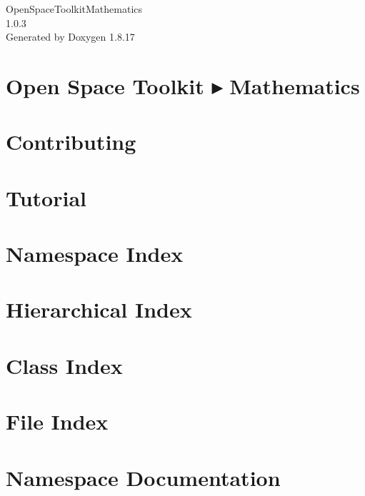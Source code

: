 \let\mypdfximage\pdfximage\def\pdfximage{\immediate\mypdfximage}\documentclass[twoside]{book}
\newcommand{\+}{\discretionary{\mbox{\scriptsize$\hookleftarrow$}}{}{}}
\newcommand{\clearemptydoublepage}{%
  \newpage{\pagestyle{empty}\cleardoublepage}%
}
\begin{document}
\hypersetup{pageanchor=false,
             bookmarksnumbered=true,
             pdfencoding=unicode
            }
\begin{titlepage}
\vspace*{7cm}
\begin{center}%
{\Large Open\+Space\+Toolkit\+Mathematics \\[1ex]\large 1.\+0.\+3 }\\
\vspace*{1cm}
{\large Generated by Doxygen 1.8.17}\\
\end{center}
\end{titlepage}
\clearemptydoublepage
{}
\tableofcontents
\clearemptydoublepage
{}
\hypersetup{pageanchor=true}

\chapter{Open Space Toolkit ▸ Mathematics}
\label{index}\hypertarget{index}{}
\chapter{Contributing}
\label{md__c_o_n_t_r_i_b_u_t_i_n_g}

\chapter{Tutorial}
\label{md_docs__tutorial}

\chapter{Namespace Index}

\chapter{Hierarchical Index}

\chapter{Class Index}

\chapter{File Index}

\chapter{Namespace Documentation}













\end{document}
